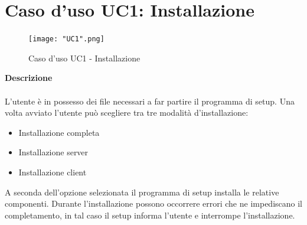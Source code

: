 \documentclass[a4paper]{report}
\begin{document}
		\section{Caso d'uso UC1: Installazione}
			\begin{figure}[H]
				\centering
				\texttt{[image: "UC1".png]}
				\caption{Caso d'uso UC1 - Installazione}
			\end{figure}
		 \textbf{Descrizione} \\ \\
		 L'utente è in possesso dei file necessari a far partire il programma di setup. Una volta avviato
		  l'utente può scegliere tra tre modalità d'installazione: 
		 \begin{itemize}
		 	\item Installazione completa
		 	\item Installazione server
		 	\item Installazione client
		 \end{itemize}
		 A seconda dell'opzione selezionata il programma di setup installa le relative componenti. Durante 
		 l'installazione possono occorrere errori che ne impediscano il completamento, in tal caso il setup
		 informa l'utente e interrompe l'installazione.
\end{document}
